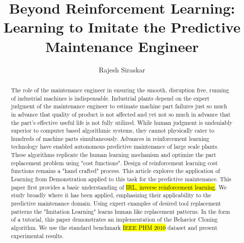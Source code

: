 \documentclass{article}
\title{Beyond Reinforcement Learning: Learning to Imitate the Predictive Maintenance Engineer}
\author{Rajesh Siraskar}
\newcommand{\hlc}[2][blue!10]{{\colorlet{foo}{#1} \sethlcolor{foo}\hl{#2}}}
\begin{document}
	\maketitle
	\begin{abstract}
		The role of the maintenance engineer in ensuring the smooth, disruption free, running of industrial machines is indispensable. Industrial plants depend on the expert judgment of the maintenance engineer to estimate machine part failures just so much in advance that quality of product is not affected and yet not so much in advance that the part's effective useful life is not fully utilized. While human judgment is undeniably superior to computer based algorithmic systems, they cannot physically cater to hundreds of machine parts simultaneously. Advances in reinforcement learning technology have enabled autonomous predictive maintenance of large scale plants. These algorithms replicate the human learning mechanism and optimize the part replacement problem using "cost functions". Design of reinforcement learning cost functions remains a "hand crafted" process. This article explores the application of Learning from Demonstration applied to this task for the predictive maintenance. This paper first provides a basic understanding of \hlc{IRL, inverse reinforcement learning}. We study broadly where it has been applied, emphasizing their applicability to the predictive maintenance domain. Using expert examples of desired tool replacement patterns the "Imitation Learning" learns human like replacement patterns. In the form of a tutorial, this paper demonstrates an implementation of the Behavior Cloning algorithm. We use the standard benchmark \hlc{IEEE PHM 2010} dataset and present experimental results.
	\end{abstract}
	
	\clearpage
\end{document}
